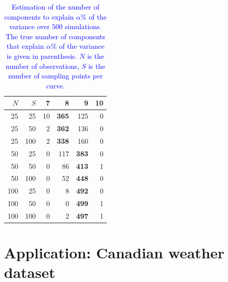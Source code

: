 \begin{table}
\begin{subtable}[h]{0.45\textwidth}
\begin{tabular}{rr|rrrr}
    $N$ & $S$ & 7 & 8 & 9 & 10\\
    \hline
    25 & 25 & 10 & \textbf{365} & 125 & 0\\
    25 & 50 & 2 & \textbf{362} & 136 & 0\\
    25 & 100 & 2 & \textbf{338} & 160 & 0\\
    50 & 25 & 0 & 117 & \textbf{383} & 0\\
    50 & 50 & 0 & 86 & \textbf{413} & 1\\
    50 & 100 & 0 & 52 & \textbf{448} & 0\\
    100 & 25 & 0 & 8 & \textbf{492} & 0\\
    100 & 50 & 0 & 0 & \textbf{499} & 1\\
    100 & 100 & 0 & 2 & \textbf{497} & 1\\
\end{tabular}
\caption{$\alpha = 99\%$ ($\text{NPC}_{\alpha} = 10$)}
\end{subtable}
\caption{\textcolor{blue}{Estimation of the number of components to explain $\alpha\%$ of the variance over $500$ simulations. The true number of components that explain $\alpha\%$ of the variance is given in parenthesis. $N$ is the number of observations, $S$ is the number of sampling points per curve.}}
\label{fig:npc_estim}
\end{table}



\section{Application: Canadian weather dataset} %
\label{sec:application_canadian_weather_dataset}

